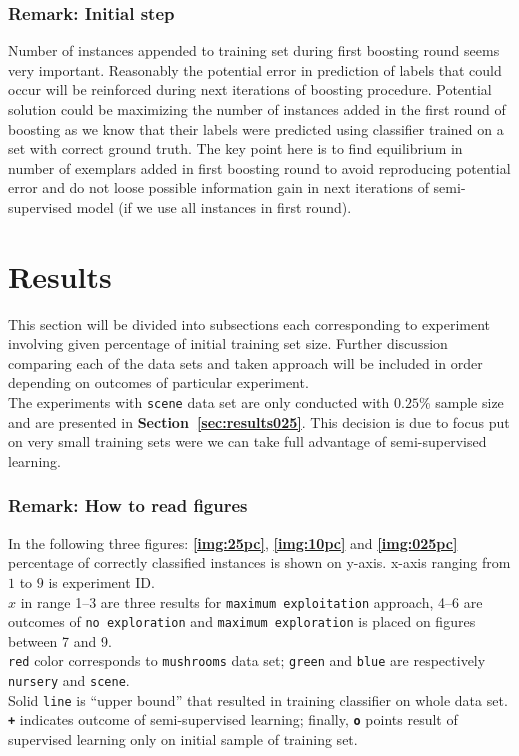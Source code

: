 \documentclass[12pt, a4paper, pdflatex]{report}
\begin{document}
\subsubsection{Remark: Initial step}
Number of instances appended to training set during first boosting round seems very important. Reasonably the potential error in prediction of labels that could occur will be reinforced during next iterations of boosting procedure. Potential solution could be maximizing the number of instances added in the first round of boosting as we know that their labels were predicted using classifier trained on a set with correct ground truth. The key point here is to find equilibrium in number of exemplars added in first boosting round to avoid reproducing potential error and do not loose possible information gain in next iterations of semi-supervised model (if we use all instances in first round).

\section{Results~\cite{results} \label{sec:results}}
This section will be divided into subsections each corresponding to experiment involving given percentage of initial training set size. Further discussion comparing each of the data sets and taken approach will be included in order depending on outcomes of particular experiment.\\

The experiments with \texttt{scene} data set are only conducted with $0.25\%$ sample size and are presented in \textbf{Section~\ref{sec:results025}}. This decision is due to focus put on very small training sets were we can take full advantage of semi-supervised learning.

\subsubsection{Remark: How to read figures}
In the following three figures: \textbf{\ref{img:25pc}}, \textbf{\ref{img:10pc}} and \textbf{\ref{img:025pc}} percentage of correctly classified instances is shown on y-axis. x-axis ranging from $1$ to $9$ is experiment ID.\\
$x$ in range 1--3 are three results for \texttt{maximum exploitation} approach, 4--6 are outcomes of \texttt{no exploration} and \texttt{maximum exploration} is placed on figures between 7 and 9.\\
\texttt{red} color corresponds to \texttt{mushrooms} data set; \texttt{green} and \texttt{blue} are respectively \texttt{nursery} and \texttt{scene}.\\
Solid \texttt{line} is ``upper bound'' that resulted in training classifier on whole data set. \texttt{\textbf{+}} indicates outcome of semi-supervised learning; finally, \texttt{\textbf{o}} points result of supervised learning only on initial sample of training set.
\end{document}
